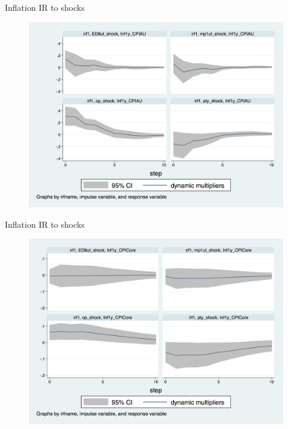 \documentclass{beamer}
\begin{document}
\begin{frame}{Inflation IR to  shocks}

\begin{figure}
	\includegraphics[scale=0.3]{figures/CPIAU_ashocks.png} 
\end{figure}

\end{frame}


\begin{frame}{Inflation IR to  shocks}

\begin{figure}
	\includegraphics[scale=0.3]{figures/CPICore_ashocks.png} 
\end{figure}

\end{frame}
\end{document}
